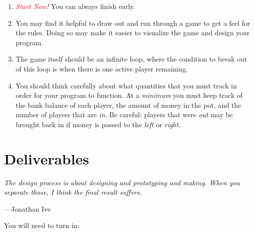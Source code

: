 \documentclass{article}
\begin{document}
\begin{enumerate}

\item \emph{\textcolor{red}{Start Now!}} You can always finish early.

\item You may find it helpful to draw out and run through a game to get a feel
    for the rules. Doing so may make it easier to visualize the game and design
    your program.
\item The game itself should be an infinite loop, where the condition to break
    out of this loop is when there is one active player remaining.
\item You should think carefully about what quantities that you
must track in order for your program to function. At a \emph{minimum}
you must keep track of the bank balance of each player, the amount
of money in the pot, and the number of players that are \emph{in}.
Be careful: players that were \emph{out} may be brought back in if
money is passed to the \emph{left} or \emph{right}.

\end{enumerate}


\section{Deliverables}
\epigraph{\emph{The design process is about designing and prototyping and
making. When you separate those, I think the final result
suffers.}}{---Jonathan Ive}

You will need to turn in:
\end{document}
